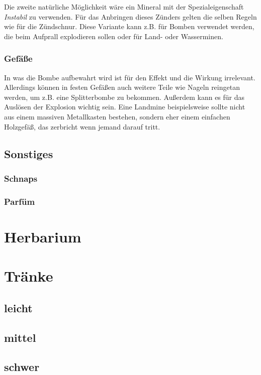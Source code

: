 Die zweite natürliche Möglichkeit wäre ein Mineral mit der Spezialeigenschaft \textit{Instabil} zu verwenden. Für das Anbringen dieses Zünders gelten die selben Regeln wie für die Zündschnur. Diese Variante kann z.B. für Bomben verwendet werden, die beim Aufprall explodieren sollen oder für Land- oder Wasserminen.

\subsubsection{Gefäße}
In was die Bombe aufbewahrt wird ist für den Effekt und die Wirkung irrelevant. Allerdings können in festen Gefäßen auch weitere Teile wie Nageln reingetan werden, um z.B. eine Splitterbombe zu bekommen. Außerdem kann es für das Auslösen der Explosion wichtig sein. Eine Landmine beispielsweise sollte nicht aus einem massiven Metallkasten bestehen, sondern eher einem einfachen Holzgefäß, das zerbricht wenn jemand darauf tritt.

\subsection{Sonstiges}

\subsubsection{Schnaps}

\subsubsection{Parfüm}


\section{Herbarium}


\section{Tränke}
\subsection{leicht}
\subsection{mittel}
\subsection{schwer}


